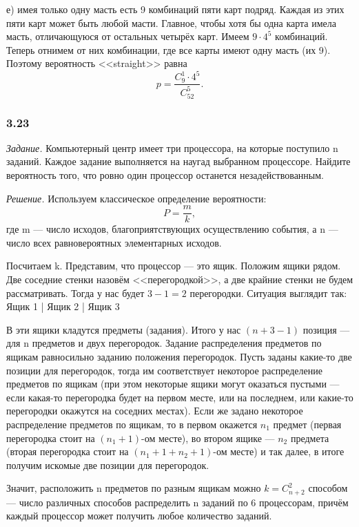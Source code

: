 \documentclass{book}
\begin{document}
е) имея только одну масть есть 9 комбинаций пяти карт подряд.
Каждая из этих пяти карт может быть любой масти.
Главное, чтобы хотя бы одна карта имела масть, отличающуюся от остальных четырёх карт.
Имеем $ 9 \cdot 4^5 $ комбинаций.
Теперь отнимем от них комбинации, где все карты имеют одну масть (их 9).
Поэтому вероятность <<straight>> равна
$$ p =
\frac{ C_9^1 \cdot 4^5 }{ C_{52}^5 }.$$

\subsubsection*{3.23}

\textit{Задание.} Компьютерный центр имеет три процессора, на которые поступило n заданий.
Каждое задание выполняется на наугад выбранном процессоре.
Найдите вероятность того, что ровно один процессор останется незадействованным.

\textit{Решение.} Используем классическое определение вероятности:
$$ P = \frac{m}{k},$$
где m --- число исходов, благоприятствующих осуществлению события, а n --- число всех равновероятных элементарных исходов.

Посчитаем k.
Представим, что процессор --- это ящик.
Положим ящики рядом.
Две соседние стенки назовём <<перегородкой>>, а две крайние стенки не будем рассматривать.
Тогда у нас будет $ 3 - 1 = 2 $ перегородки.
Ситуация выглядит так: Ящик 1 | Ящик 2 | Ящик 3

В эти ящики кладутся предметы (задания).
Итого у нас $ \left( n + 3 - 1 \right) $ позиция --- для n предметов и двух перегородок.
Задание распределения предметов по ящикам равносильно заданию положения перегородок.
Пусть заданы какие-то две позиции для перегородок,
тогда им соответствует некоторое распределение предметов по ящикам
(при этом некоторые ящики могут оказаться пустыми ---
если какая-то перегородка будет на первом месте,
или на последнем, или какие-то перегородки окажутся на соседних местах).
Если же задано некоторое распределение предметов по ящикам,
то в первом окажется $ n_1 $  предмет
(первая перегородка стоит на
$ \left( n_1 + 1 \right) $-ом месте),
во втором ящике --- $ n_2 $ предмета
(вторая перегородка стоит на
$ \left( n_1 + 1 + n_2 +1 \right) $-ом месте)
и так далее, в итоге получим искомые две позиции для перегородок.

Значит, расположить n предметов по разным ящикам можно
$ k = C_{n+2}^{2} $ способом ---
число различных способов распределить n заданий по 6 процессорам,
причём каждый процессор может получить любое количество заданий.
\end{document}
